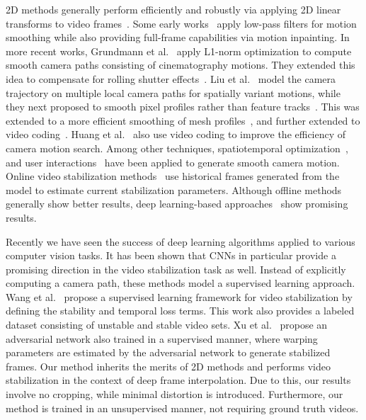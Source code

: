 2D methods generally perform efficiently and robustly via applying 2D linear transforms to video frames~\cite{gleicher2007re}.
Some early works~\cite{matsushita2006full,chen2008capturing} apply low-pass filters for motion smoothing while also providing full-frame capabilities via motion inpainting.
In more recent works, Grundmann et al.~ apply L1-norm optimization to compute smooth camera paths consisting of cinematography motions. 
They extended this idea to compensate for rolling shutter effects~\cite{grundmann2012calibration}.
Liu et al.~ model the camera trajectory on multiple local camera paths for spatially variant motions, while they next proposed to smooth pixel profiles rather than feature tracks~\cite{liu2014steadyflow}.
This was extended to a more efficient smoothing of mesh profiles~\cite{liu2016meshflow}, and further extended to video coding~\cite{liu2017codingflow}.
Huang et al.~ also use video coding to improve the efficiency of camera motion search.
Among other techniques, spatiotemporal optimization~\cite{wang2013spatially}, and user interactions~\cite{bai2014user} have been applied to generate smooth camera motion.
Online video stabilization methods~\cite{liu2016meshflow,wang2018deep,xu2018deep,liu2017codingflow} use historical frames generated from the model to estimate current stabilization parameters.
Although offline methods generally show better results, deep learning-based approaches~\cite{wang2018deep,xu2018deep} show promising results.

Recently we have seen the success of deep learning algorithms applied to various computer vision tasks.
It has been shown that CNNs in particular provide a promising direction in the video stabilization task as well.
Instead of explicitly computing a camera path, these methods model a supervised learning approach.
Wang et al.~ propose a supervised learning framework for video stabilization by defining the stability and temporal loss terms. 
This work also provides a labeled dataset consisting of unstable and stable video sets.
Xu et al.~ propose an adversarial network also trained in a supervised manner, where warping parameters are estimated by the adversarial network to generate stabilized frames.
Our method inherits the merits of 2D methods and performs video stabilization in the context of deep frame interpolation.
Due to this, our results involve no cropping, while minimal distortion is introduced.
Furthermore, our method is trained in an unsupervised manner, not requiring ground truth videos.




